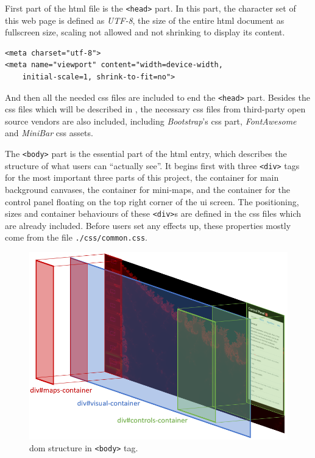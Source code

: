 First part of the \gls{html} file is the \texttt{<head>} part. In this part, the character set of this web page is defined as \emph{UTF-8}, the size of the entire \gls{html} document as fullscreen size, scaling not allowed and not shrinking to display its content.

\begin{verbatim}
<meta charset="utf-8">
<meta name="viewport" content="width=device-width,
    initial-scale=1, shrink-to-fit=no">
\end{verbatim}

And then all the needed \gls{css} files are included to end the \texttt{<head>} part. Besides the \gls{css} files which will be described in , the necessary \gls{css} files from third-party open source vendors are also included, including \emph{Bootstrap}'s \gls{css} part, \emph{FontAwesome} and \emph{MiniBar} \gls{css} assets.

The \texttt{<body>} part is the essential part of the \gls{html} entry, which describes the structure of what users can ``actually see''. It begins first with three \texttt{<div>} tags for the most important three parts of this project, the container for main background canvases, the container for mini-maps, and the container for the control panel floating on the top right corner of the \gls{ui} screen. The positioning, sizes and container behaviours of these \texttt{<div>}s are defined in the \gls{css} files which are already included. Before users set any effects up, these properties mostly come from the file \texttt{./css/common.css}.

\begin{figure}[th]
\centering
\includegraphics[width=\textwidth,keepaspectratio]{Figures/Chapter4/rootdom.png}
\decoRule
\caption[DOM Body Structure]{\gls{dom} structure in \texttt{<body>} tag.}
\label{fig:rootdom}
\end{figure}


